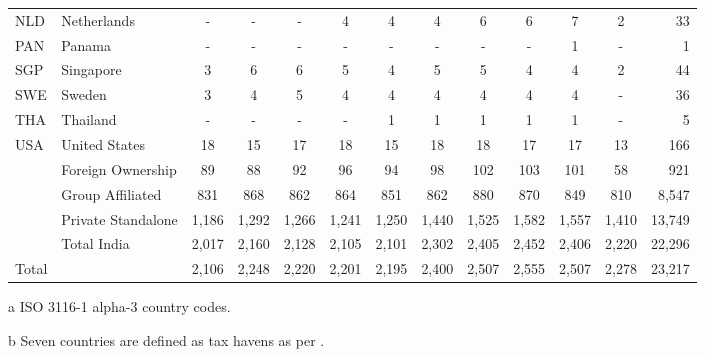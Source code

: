 \begin{sidewaystable}[ht]
{\begin{threeparttable}
\begin{tabular}{llccccccccccr}
NLD & Netherlands & - & - & - & 4 & 4 & 4 & 6 & 6 & 7 & 2 & 33 \\
PAN & Panama\tnote{b} & - & - & - & - & - & - & - & - & 1 & - & 1 \\
SGP & Singapore\tnote{b} & 3 & 6 & 6 & 5 & 4 & 5 & 5 & 4 & 4 & 2 & 44 \\
SWE & Sweden & 3 & 4 & 5 & 4 & 4 & 4 & 4 & 4 & 4 & - & 36 \\
THA & Thailand & - & - & - & - & 1 & 1 & 1 & 1 & 1 & - & 5 \\
USA & United States & 18 & 15 & 17 & 18 & 15 & 18 & 18 & 17 & 17 & 13 & 166 \\
\midrule
 & Foreign Ownership & 89 & 88 & 92 & 96 & 94 & 98 & 102 & 103 & 101 & 58 & 921 \\
\midrule 
 & Group Affiliated & 831 & 868 & 862 & 864 & 851 & 862 & 880 & 870 & 849 & 810 & 8,547 \\
 & Private Standalone & 1,186 & 1,292 & 1,266 & 1,241 & 1,250 & 1,440 & 1,525 & 1,582 & 1,557 & 1,410 & 13,749 \\
 & Total India & 2,017 & 2,160 & 2,128 & 2,105 & 2,101 & 2,302 & 2,405 & 2,452 & 2,406 & 2,220 & 22,296 \\
\midrule
Total &   & 2,106 & 2,248 & 2,220 & 2,201 & 2,195 & 2,400 & 2,507 & 2,555 & 2,507 & 2,278 & 23,217 \\
\bottomrule  
 \end{tabular}
 \begin{tablenotes}
 \item[a] ISO 3116-1 alpha-3 country codes.
 \item[b] Seven countries are defined as tax havens as per \cite{Dharmapala2009}. 
 \end{tablenotes}
 \end{threeparttable}
  }
\end{sidewaystable}


